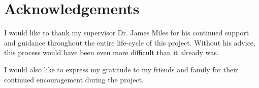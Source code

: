\chapter*{Acknowledgements}
I would like to thank my supervisor Dr. James Miles for his continued support and guidance throughout the entire life-cycle of this project. Without his advice, this process would have been even more difficult than it already was.

I would also like to express my gratitude to my friends and family for their continued encouragement during the project.